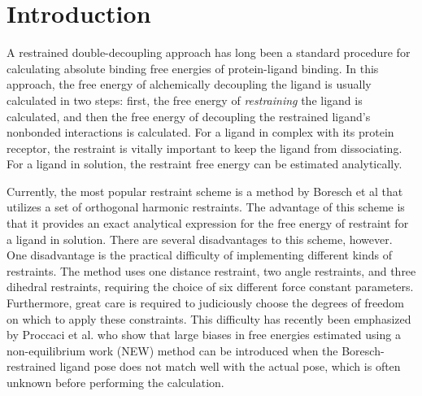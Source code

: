 \documentclass[%
 aip,
rsi,%
 amsmath,amssymb,
 reprint,%
]{revtex4-1}
\begin{document}

\section*{Introduction}

A restrained double-decoupling approach has long been a standard procedure for calculating absolute binding free energies of protein-ligand binding.  In this approach, the free energy of alchemically decoupling the ligand is usually calculated in two steps: first, the free energy of \textit{restraining} the ligand is calculated, and then the free energy of decoupling the restrained ligand's nonbonded interactions is calculated.     For a ligand in complex with its protein receptor, the restraint is vitally important to keep the ligand from dissociating.  For a ligand in solution, the restraint free energy can be estimated analytically. 

Currently, the most popular restraint scheme is a method by Boresch et al \cite{boresch2003absolute} that utilizes a set of orthogonal harmonic restraints.  The advantage of this scheme is that it provides an exact analytical expression for the free energy of restraint for a ligand in solution.    There are several disadvantages to this scheme, however.  One disadvantage is the practical difficulty of implementing different kinds of restraints.  The method uses one distance restraint, two angle restraints, and three dihedral restraints, requiring the choice of six different force constant parameters.  Furthermore, great care is required to judiciously choose the degrees of freedom on which to apply these constraints.  This difficulty has recently been emphasized by Proccaci et al. \cite{procacci2021ns} who show that large biases in free energies estimated using a non-equilibrium work (NEW) method can be introduced when the Boresch-restrained ligand pose does not match well with the actual pose, which is often unknown before performing the calculation.
\end{document}
